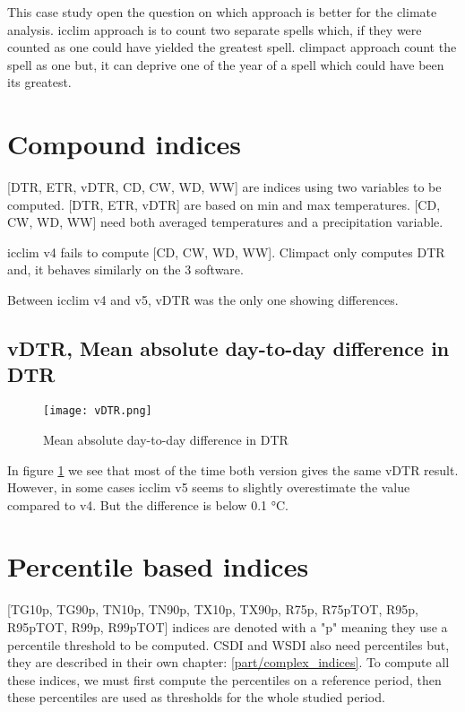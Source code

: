\documentclass[a4paper,11pt]{article}
\begin{document}
        This case study open the question on which approach is better for the climate analysis.
        icclim approach is to count two separate spells which, if they were counted as one could have yielded the greatest spell.
        climpact approach count the spell as one but, it can deprive one of the year of a spell which could have been its greatest.


    \section{Compound indices}
        [DTR, ETR, vDTR, CD, CW, WD, WW] are indices using two variables to be computed.
        [DTR, ETR, vDTR] are based on min and max temperatures.
        [CD, CW, WD, WW] need both averaged temperatures and a precipitation variable.
        
        icclim v4 fails to compute [CD, CW, WD, WW].
        Climpact only computes DTR and, it behaves similarly on the 3 software. 

        Between icclim v4 and v5, vDTR was the only one showing differences.

        \subsection{vDTR, Mean absolute day-to-day difference in DTR}
            \begin{figure}[!hbt]
                \centering
                \texttt{[image: vDTR.png]}
                \caption{Mean absolute day-to-day difference in DTR}
                \label{figure/vdtr}
            \end{figure}
            In figure \ref{figure/vdtr} we see that most of the time both version gives the same vDTR result.
            However, in some cases icclim v5 seems to slightly overestimate the value compared to v4. But the difference is below 0.1 °C.

    \section{Percentile based indices}
        [TG10p, TG90p, TN10p, TN90p, TX10p, TX90p, R75p, R75pTOT, R95p, R95pTOT, R99p, R99pTOT] indices are denoted with a "p" meaning they use a percentile threshold to be computed. 
        CSDI and WSDI also need percentiles but, they are described in their own chapter: \ref{part/complex_indices}.
        To compute all these indices, we must first compute the percentiles on a reference period, then these percentiles are used as thresholds for the whole studied period.\\
\end{document}
